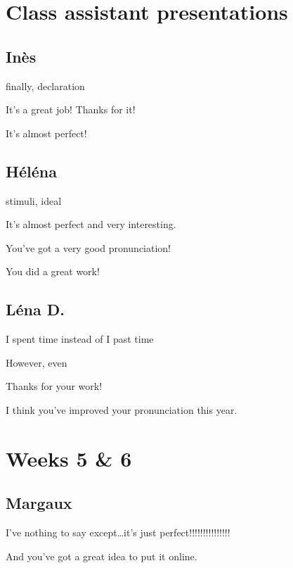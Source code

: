 \documentclass[12pt,oneside]{report}
\begin{document}
\begin{spacing}{1.2}
\section{Class assistant presentations}

\subsection*{Inès}

finally, declaration

\color{blue}
It's a great job! Thanks for it!

It's almost perfect!
\color{black}

\subsection*{Héléna}

stimuli, ideal

\color{blue}
It's almost perfect and very interesting.

You've got a very good pronunciation!

You did a great work!
\color{black}

\subsection*{Léna D.}

\color{blue}
\og I spent time\fg{} instead of \og I past time \fg{} 
\color{black}

However, even

\color{blue}
Thanks for your work!

I think you've improved your pronunciation this year.
\color{black}


\section{Weeks 5 \& 6}

\subsection*{Margaux}

\color{blue}
I've nothing to say except\dots it's just perfect!!!!!!!!!!!!!!!

And you've got a great idea to put it online. 



\end{spacing}
\end{document}
